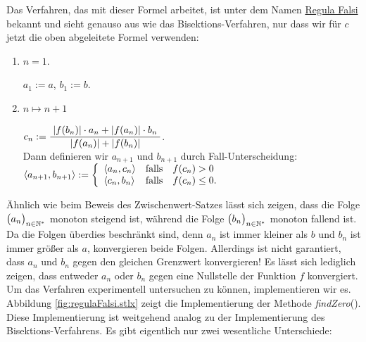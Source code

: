 Das Verfahren, das mit dieser Formel arbeitet, ist unter dem Namen 
\href{http://de.wikipedia.org/wiki/Regula_falsi}{Regula Falsi}
bekannt und sieht genauso aus wie das Bisektions-Verfahren, nur dass wir f\"ur $c$ jetzt
die oben abgeleitete Formel verwenden:
\begin{enumerate}
\item[I.A.:] $n=1$.

      $a_1 := a$, \quad $b_1 := b$.
\item[I.S.:] $n \mapsto n+1$

      \hspace*{1.3cm} $c_n := \displaystyle\frac{\;\displaystyle|f(b_n)|\cdot a_n + |f(a_n)|\cdot b_n\;}{\;\displaystyle|f(a_n)| + |f(b_n)|\;}$. \\[0.3cm]
      Dann definieren wir $a_{n+1}$ und $b_{n+1}$ durch Fall-Unterscheidung:
      \\[0.2cm]
      \hspace*{1.3cm}
      $\pair(a_{n+1},b_{n+1}) := 
         \left\{ \begin{array}{ll}
                 \pair(a_n,c_n) & \mbox{falls}\quad f(c_n) >    0 \\
                 \pair(c_n,b_n) & \mbox{falls}\quad f(c_n) \leq 0. \\
                 \end{array}
         \right.
      $
\end{enumerate}
\"Ahnlich wie beim Beweis des Zwischenwert-Satzes l\"asst sich zeigen, dass die Folge
$\bigl(a_n\bigr)_{n\in\mathbb{N}^*}$ monoton steigend ist, w\"ahrend die Folge $\bigl(b_n\bigr)_{n\in\mathbb{N}^*}$ monoton fallend ist.
Da die Folgen \"uberdies beschr\"ankt sind, denn $a_n$ ist immer kleiner als $b$ und $b_n$ ist
immer gr\"o{\ss}er als $a$, konvergieren beide Folgen.  Allerdings ist nicht garantiert, dass
$a_n$ und $b_n$ gegen den gleichen Grenzwert konvergieren!  Es l\"asst sich lediglich zeigen,
dass entweder $a_n$ oder $b_n$ gegen eine Nullstelle der Funktion $f$ konvergiert.
Um das Verfahren experimentell untersuchen zu k\"onnen, implementieren wir es.
Abbildung \ref{fig:regulaFalsi.stlx} zeigt die Implementierung der Methode
\textsl{findZero}().   Diese Implementierung ist weitgehend analog zu der Implementierung des
Bisektions-Verfahrens.  Es gibt eigentlich nur zwei wesentliche Unterschiede:
